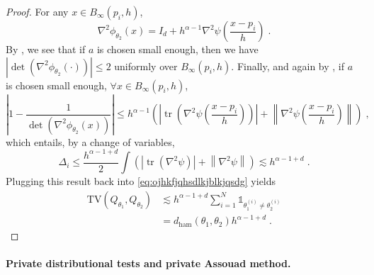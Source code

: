 \documentclass{article}
\theoremstyle{plain}
\theoremstyle{definition}
\theoremstyle{remark}
\newcommand{\Ind}[0]{\mathds{1}}
\newcommand\tv[2]{\mathrm{TV}\left( {#1}, {#2} \right)}
\newcommand\ham[2]{d_\mathrm{ham}\left( {#1}, {#2} \right)}
\newcommand\p[1]{\left( {#1}\right)}
\newcommand\tr[0]{\operatorname{tr}}
\begin{document}
\begin{proof}
   For any $x \in B_{\infty}(p_i, h)$,
   \begin{equation}
       \nabla^2 \phi_{\theta_2}(x) = I_d + h^{\alpha-1} \nabla^2 \psi \p{\frac{x-p_i}{h}} \;.
   \end{equation}
   By , we see that if $a$ is chosen small enough, then we have $|\det(\nabla^2 \phi_{\theta_2}(\cdot))| \leq 2$ uniformly over $B_{\infty}(p_i, h)$.
   Finally, and again by , if $a$ is chosen small enough, $\forall x \in B_{\infty}(p_i, h)$,
   \begin{equation}
       \left| 1 - \frac{1}{\det(\nabla^2 \phi_{\theta_2}(x))} \right| \leq h^{\alpha - 1} \p{ \left| \tr \p{\nabla^2\psi \p{\frac{x-p_i}{h}}} \right| + \left\| \nabla^2\psi \p{\frac{x-p_i}{h}} \right\|} \;,
   \end{equation}
   which entails, by a change of variables,
   \begin{equation}
       \Delta_i \leq \frac{h^{\alpha - 1 + d}}{2} \int \p{ \left| \tr \p{\nabla^2 \psi} \right| + \left\| \nabla^2\psi  \right\|} \lesssim h^{\alpha - 1 + d} \;.
   \end{equation}
   Plugging this result back into \eqref{eq:ojhkfjqhsdlkjblkjqsdg} yields
   \begin{equation}
       \begin{aligned}
        \tv{Q_{\theta_1}}{Q_{\theta_2}} 
        &\lesssim h^{\alpha - 1 + d} \sum_{i=1}^{N} \Ind_{\theta_1^{(i)} \neq \theta_2^{(i)}} \\
        &= \ham{\theta_1}{\theta_2}  h^{\alpha - 1 + d} \;.
    \end{aligned}
   \end{equation}
\end{proof}

    

    \paragraph{Private distributional tests and private Assouad method.}
\end{document}
